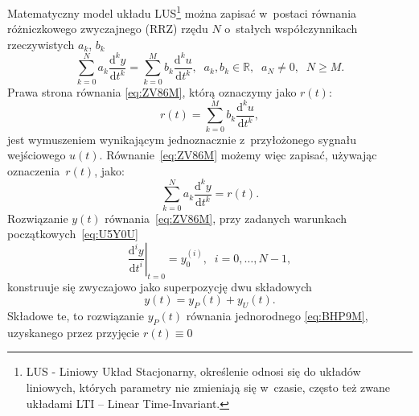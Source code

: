 \documentclass[paper=a4,DIV=12]{lpas}
\newcommand{\odn}[3]{\frac{\mathrm{d}^{#1}#2}{\mathrm{d}{#3}^{#1}}}
\begin{document}
Matematyczny model układu LUS\footnote{LUS - Liniowy Układ Stacjonarny,
określenie odnosi się do układów liniowych, których parametry nie zmieniają
się w~czasie, często też zwane układami LTI -- Linear Time-Invariant.} można
zapisać w~postaci równania różniczkowego zwyczajnego (RRZ) rzędu $N$
o~stałych współczynnikach rzeczywistych $a_k$, $b_k$
\begin{equation}
  \sum_{k = 0}^{N} a_k \odn{k}{y}{t} = \sum_{k = 0}^{M} b_k \odn{k}{u}{t},
  \;\; a_k, b_k \in \mathbb{R}, \;\; a_N \neq 0, \;\; N \ge M.
  \label{eq:ZV86M}
\end{equation}
Prawa strona równania \eqref{eq:ZV86M}, którą oznaczymy jako $r(t)$:
\begin{equation}
  r(t) = \sum_{k = 0}^{M} b_k \odn{k}{u}{t},
  \label{eq:D11SS}
\end{equation}
jest wymuszeniem wynikającym jednoznacznie z~przyłożonego sygnału wejściowego
$u(t)$. Równanie~\eqref{eq:ZV86M} możemy więc zapisać, używając
oznaczenia~$r(t)$, jako:
\begin{equation}
  \sum_{k = 0}^{N} a_k \odn{k}{y}{t} = r(t).
  \label{eq:41PZG}
\end{equation}
Rozwiązanie $y(t)$ równania~\eqref{eq:ZV86M}, przy zadanych warunkach
początkowych~\eqref{eq:U5Y0U}
\begin{equation}
  \left.\odn{i}{y}{t}\right|_{t=0} = y^{(i)}_0, \;\; i = 0, \dots, N-1,
  \label{eq:U5Y0U}
\end{equation}
konstruuje się zwyczajowo jako superpozycję dwu składowych
\begin{equation}
  y(t) = y_P(t) + y_U(t).
  \label{eq:V92W6}
\end{equation}
Składowe te, to rozwiązanie $y_P(t)$ równania jednorodnego \eqref{eq:BHP9M},
uzyskanego przez przyjęcie $r(t) \equiv 0$
\end{document}
